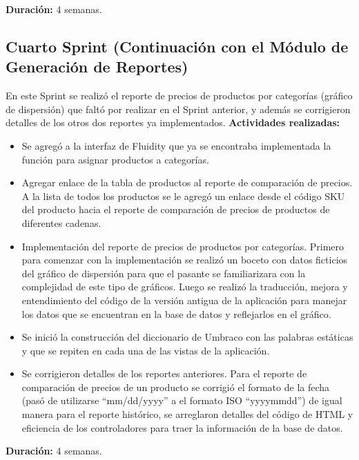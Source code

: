 \textbf{Duración:} 4 semanas.

\subsection{Cuarto Sprint (Continuación con el Módulo de Generación de Reportes)}

En este Sprint se realizó el reporte de precios de productos por categorías (gráfico de dispersión) que faltó por realizar en el Sprint anterior, y además se corrigieron detalles de los otros dos reportes ya implementados.
\vskip 0.5cm
\textbf{Actividades realizadas:}
\begin{itemize}
   \item Se agregó a la interfaz de Fluidity que ya se encontraba implementada la función para asignar productos a categorías.
   \item Agregar enlace de la tabla de productos al reporte de comparación de precios. A la lista de todos los productos se le agregó un enlace desde el código SKU del producto hacia el reporte de comparación de precios de productos de diferentes cadenas.
   \item Implementación del reporte de precios de productos por categorías. Primero para comenzar con la implementación se realizó un boceto con datos ficticios del gráfico de dispersión para que el pasante se familiarizara con la complejidad de este tipo de gráficos. Luego se realizó la traducción, mejora y entendimiento del código de la versión antigua de la aplicación para manejar los datos que se encuentran en la base de datos y reflejarlos en el gráfico.
   \item Se inició la construcción del diccionario de Umbraco con las palabras estáticas y que se repiten en cada una de las vistas de la aplicación.
   \item Se corrigieron detalles de los reportes anteriores. Para el reporte de comparación de precios de un producto se corrigió el formato de la fecha (pasó  de utilizarse “mm/dd/yyyy” a el formato ISO “yyyymmdd”) de igual manera para el reporte histórico, se arreglaron detalles del código de HTML y eficiencia de los controladores para traer la información de la base de datos.
\end{itemize}

\textbf{Duración:} 4 semanas.


